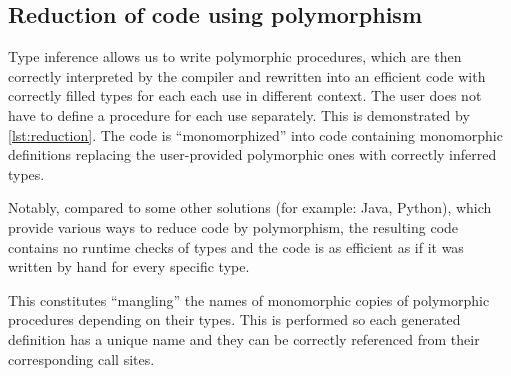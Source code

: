 \subsection{Reduction of code using polymorphism}

Type inference allows us to write polymorphic procedures, which are then correctly interpreted by the compiler and rewritten into an efficient code with correctly filled types for each each use in different context. The user does not have to define a procedure for each use separately. This is demonstrated by \cref{lst:reduction}. The code is ``monomorphized'' into code containing monomorphic definitions replacing the user-provided polymorphic ones with correctly inferred types.

Notably, compared to some other solutions (for example: Java, Python), which provide various ways to reduce code by polymorphism, the resulting code contains no runtime checks of types and the code is as efficient as if it was written by hand for every specific type.

This constitutes ``mangling'' the names of monomorphic copies of polymorphic procedures depending on their types. This is performed so each generated definition has a unique name and they can be correctly referenced from their corresponding call sites.

